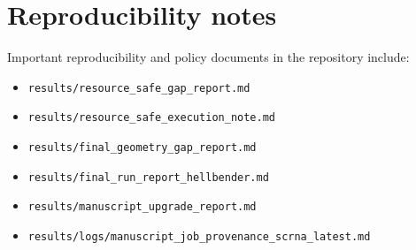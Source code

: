 \documentclass[11pt]{article}
\begin{document}
\section{Reproducibility notes}
Important reproducibility and policy documents in the repository include:
\begin{itemize}[leftmargin=1.5em]
\item \texttt{results/resource\_safe\_gap\_report.md}
\item \texttt{results/resource\_safe\_execution\_note.md}
\item \texttt{results/final\_geometry\_gap\_report.md}
\item \texttt{results/final\_run\_report\_hellbender.md}
\item \texttt{results/manuscript\_upgrade\_report.md}
\item \texttt{results/logs/manuscript\_job\_provenance\_scrna\_latest.md}
\end{itemize}
\end{document}
